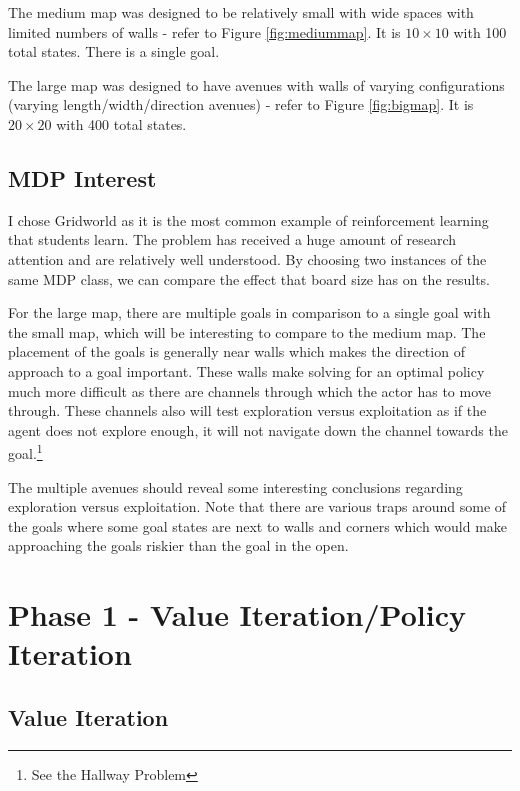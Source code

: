 \documentclass[11pt]{article}
\begin{document}
The medium map was designed to be relatively small with wide spaces with limited numbers of walls - refer to Figure \ref{fig:mediummap}. It is $10 \times 10$ with 100 total states. There is a single goal.

The large map was designed to have avenues with walls of varying configurations (varying length/width/direction avenues) - refer to Figure \ref{fig:bigmap}. It is $20 \times 20$ with 400 total states.

\subsection{MDP Interest}
I chose Gridworld as it is the most common example of reinforcement learning that students learn. The problem has received a huge amount of research attention and are relatively well understood. By choosing two instances of the same MDP class, we can compare the effect that board size has on the results.

For the large map, there are multiple goals in comparison to a single goal with the small map, which will be interesting to compare to the medium map. The placement of the goals is generally near walls which makes the direction of approach to a goal important. These walls make solving for an optimal policy much more difficult as there are channels through which the actor has to move through. These channels also will test exploration versus exploitation as if the agent does not explore enough, it will not navigate down the channel towards the goal.\footnote{See the Hallway Problem}

The multiple avenues should reveal some interesting conclusions regarding exploration versus exploitation. Note that there are various traps around some of the goals where some goal states are next to walls and corners which would make approaching the goals riskier than the goal in the open.





\section{Phase 1 - Value Iteration/Policy Iteration}

\subsection{Value Iteration}
\end{document}
